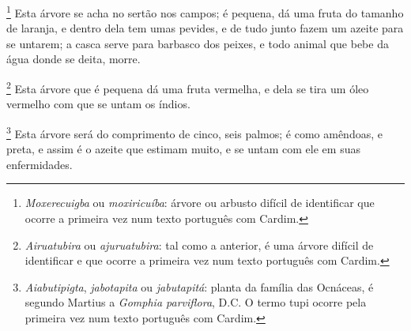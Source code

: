 \footnote{ \textit{Moxerecuigba} ou
\textit{moxiricuíba}: árvore ou arbusto difícil de identificar que
ocorre a primeira vez num texto português com Cardim.} Esta árvore se
acha no sertão nos campos; é pequena, dá uma fruta do tamanho de
laranja, e dentro dela tem umas pevides, e de tudo junto fazem um
azeite para se untarem; a casca serve para barbasco dos peixes, e todo
animal que bebe da água donde se deita, morre. 

\footnote{ \textit{Airuatubira} ou
\textit{ajuruatubira}: tal como a anterior, é uma árvore difícil de
identificar e que ocorre a primeira vez num texto português com
Cardim.} Esta árvore que é pequena dá uma fruta vermelha, e
dela se tira um óleo vermelho com que se untam os índios. 

\footnote{ \textit{Aiabutipigta}, 
\textit{jabotapita} ou \textit{jabutapitá}: planta da família das
Ocnáceas, é segundo Martius a \textit{Gomphia parviflora}, D.C. O
termo tupi ocorre pela primeira vez num texto português com
Cardim.} Esta árvore será do comprimento de cinco, seis
palmos; é como amêndoas, e preta, e assim é o azeite que estimam muito,
e se untam com ele em suas enfermidades.

